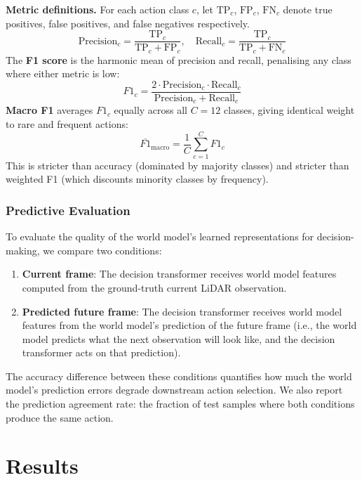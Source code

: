 \documentclass[journal]{IEEEtran}
\begin{document}
\textbf{Metric definitions.}
For each action class $c$, let $\text{TP}_c$, $\text{FP}_c$, $\text{FN}_c$ denote true positives, false positives, and false negatives respectively.
\begin{equation}
    \text{Precision}_c = \frac{\text{TP}_c}{\text{TP}_c + \text{FP}_c}, \quad
    \text{Recall}_c    = \frac{\text{TP}_c}{\text{TP}_c + \text{FN}_c}
\end{equation}
The \textbf{F1 score} is the harmonic mean of precision and recall, penalising any class where either metric is low:
\begin{equation}
    F1_c = \frac{2 \cdot \text{Precision}_c \cdot \text{Recall}_c}{\text{Precision}_c + \text{Recall}_c}
\end{equation}
\textbf{Macro F1} averages $F1_c$ equally across all $C{=}12$ classes, giving identical weight to rare and frequent actions:
\begin{equation}
    \overline{F1}_\text{macro} = \frac{1}{C}\sum_{c=1}^{C} F1_c
\end{equation}
This is stricter than accuracy (dominated by majority classes) and stricter than weighted F1 (which discounts minority classes by frequency).

\subsubsection{Predictive Evaluation}
To evaluate the quality of the world model's learned representations for decision-making, we compare two conditions:
\begin{enumerate}
    \item \textbf{Current frame}: The decision transformer receives world model features computed from the ground-truth current LiDAR observation.
    \item \textbf{Predicted future frame}: The decision transformer receives world model features from the world model's prediction of the future frame (i.e., the world model predicts what the next observation will look like, and the decision transformer acts on that prediction).
\end{enumerate}
The accuracy difference between these conditions quantifies how much the world model's prediction errors degrade downstream action selection. We also report the prediction agreement rate: the fraction of test samples where both conditions produce the same action.

\section{Results}
\label{sec:results}
\end{document}
